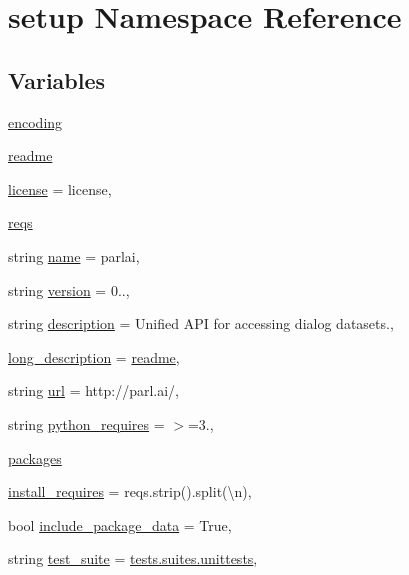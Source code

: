 \hypertarget{namespacesetup}{}\section{setup Namespace Reference}
\label{namespacesetup}
\subsection*{Variables}
\begin{DoxyCompactItemize}
\item 
\hyperlink{namespacesetup_a443be2d01fd539bf6761aff70724d876}{encoding}
\item 
\hyperlink{namespacesetup_af307481f158da7b58a33229df5e30c6c}{readme}
\item 
\hyperlink{namespacesetup_a8ed6f50a28bd6a8794f8e1153baa6de9}{license} = license,
\item 
\hyperlink{namespacesetup_a0c29631fa586cf133cd55999a817f46b}{reqs}
\item 
string \hyperlink{namespacesetup_a61de3710bf6c9d78c0afa352263f8b09}{name} = \textquotesingle{}parlai\textquotesingle{},
\item 
string \hyperlink{namespacesetup_ab177531e7a80674a3db3de2d79eb8be7}{version} = \textquotesingle{}0..\textquotesingle{},
\item 
string \hyperlink{namespacesetup_ade8aa54df2083113a10326ea2fe7934b}{description} = \textquotesingle{}Unified A\+PI for accessing dialog datasets.\textquotesingle{},
\item 
\hyperlink{namespacesetup_a4cda9dbfb952875376a0749fe08a5bde}{long\+\_\+description} = \hyperlink{namespacesetup_af307481f158da7b58a33229df5e30c6c}{readme},
\item 
string \hyperlink{namespacesetup_a3376e8b9735800b5b9e455914cee908d}{url} = \textquotesingle{}http\+://parl.\+ai/\textquotesingle{},
\item 
string \hyperlink{namespacesetup_a706f18c98c7818145eb58deff3eca806}{python\+\_\+requires} = \textquotesingle{}$>$=3.\textquotesingle{},
\item 
\hyperlink{namespacesetup_aff2375a361fd5865c77bd9aa093be747}{packages}
\item 
\hyperlink{namespacesetup_abead4f26b530856f858f0d44c7cf2588}{install\+\_\+requires} = reqs.\+strip().split(\textquotesingle{}\textbackslash{}n\textquotesingle{}),
\item 
bool \hyperlink{namespacesetup_afff286a1213d1545c5bf406189bb2679}{include\+\_\+package\+\_\+data} = True,
\item 
string \hyperlink{namespacesetup_aaedcd7e0bf209e42aef838657a6bba4a}{test\+\_\+suite} = \textquotesingle{}\hyperlink{namespacetests_1_1suites_a02a7d577493ceb024319292b96e13265}{tests.\+suites.\+unittests}\textquotesingle{},
\end{DoxyCompactItemize}


